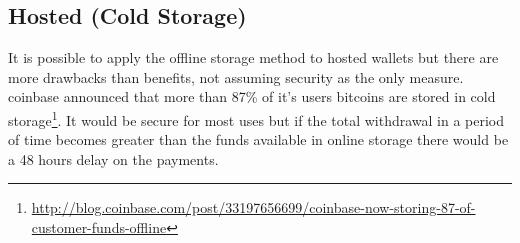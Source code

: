

\subsection{Hosted (Cold Storage)} 
It is possible to apply the offline storage method to hosted wallets but there are more drawbacks than benefits, not assuming security as the only measure. coinbase announced that more than 87\% of it's users bitcoins are stored in cold storage\footnote{\url {http://blog.coinbase.com/post/33197656699/coinbase-now-storing-87-of-customer-funds-offline}}. It would be secure for most uses but if the total withdrawal in a period of time becomes greater than the funds available in online storage there would be a 48 hours delay on the payments.


